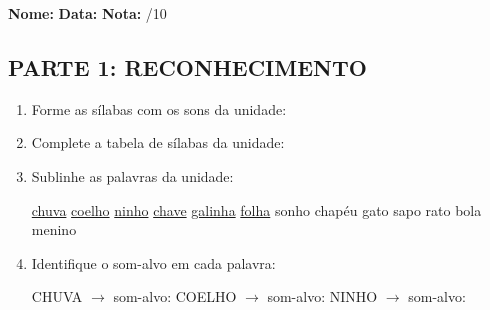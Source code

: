 \begin{exercicio}

\noindent\textbf{Nome:} \underline{\hspace{3.2cm}} \quad \textbf{Data:} \underline{\hspace{1.6cm}} \quad \textbf{Nota:} \underline{\hspace{0.9cm}}/10


\subsection*{PARTE 1: RECONHECIMENTO}

\begin{enumerate}

  \item Forme as sílabas com os sons da unidade:

\begin{center}
\end{center}

  \item Complete a tabela de sílabas da unidade:

\begin{center}
\end{center}

  \item Sublinhe as palavras da unidade:

\begin{center}
  \uline{chuva} \quad \uline{coelho} \quad \uline{ninho} \quad \uline{chave} \quad \uline{galinha} \quad \uline{folha} \quad sonho \quad chapéu \quad gato \quad sapo \quad rato \quad bola \quad menino
\end{center}

  \item Identifique o som-alvo em cada palavra:
  \begin{center}
  CHUVA $\rightarrow$ som-alvo: \underline{\hspace{1cm}} \quad COELHO $\rightarrow$ som-alvo: \underline{\hspace{1cm}} \quad NINHO $\rightarrow$ som-alvo: \underline{\hspace{1cm}}
  \end{center}


\end{enumerate}
\end{exercicio}
